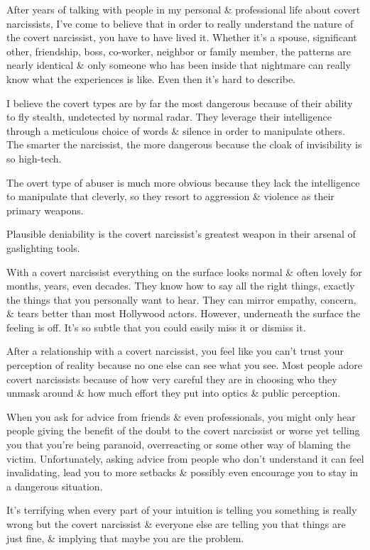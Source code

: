 \documentclass{article}
\numberwithin{equation}{section}
\begin{document}
After years of talking with people in my personal \& professional life about covert narcissists, I've come to believe that in order to really understand the nature of the covert narcissist, you have to have lived it. Whether it's a spouse, significant other, friendship, boss, co-worker, neighbor or family member, the patterns are nearly identical \& only someone who has been inside that nightmare can really know what the experiences is like. Even then it's hard to describe.

I believe the covert types are by far the most dangerous because of their ability to fly stealth, undetected by normal radar. They leverage their intelligence through a meticulous choice of words \& silence in order to manipulate others. The smarter the narcissist, the more dangerous because the cloak of invisibility is so high-tech.

The overt type of abuser is much more obvious because they lack the intelligence to manipulate that cleverly, so they resort to aggression \& violence as their primary weapons.

Plausible deniability is the covert narcissist's greatest weapon in their arsenal of gaslighting tools.

With a covert narcissist everything on the surface looks normal \& often lovely for months, years, even decades. They know how to say all the right things, exactly the things that you personally want to hear. They can mirror empathy, concern, \& tears better than most Hollywood actors. However, underneath the surface the feeling is off. It's so subtle that you could easily miss it or dismiss it.

After a relationship with a covert narcissist, you feel like you can't trust your perception of reality because no one else can see what you see. Most people adore covert narcissists because of how very careful they are in choosing who they unmask around \& how much effort they put into optics \& public perception.

When you ask for advice from friends \& even professionals, you might only hear people giving the benefit of the doubt to the covert narcissist or worse yet telling you that you're being paranoid, overreacting or some other way of blaming the victim. Unfortunately, asking advice from people who don't understand it can feel invalidating, lead you to more setbacks \& possibly even encourage you to stay in a dangerous situation.

It's terrifying when every part of your intuition is telling you something is really wrong but the covert narcissist \& everyone else are telling you that things are just fine, \& implying that maybe you are the problem.
\end{document}
